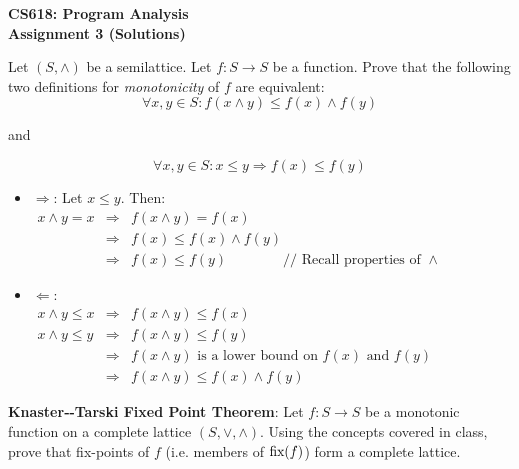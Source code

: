 \documentclass[12pt]{article}
\newcommand{\answer}[1]{{{\blue #1}}}
\newcommand{\ques}[1]{\bigskip\noindent{\bf Q#1.}}
\begin{document}

\begin{center}{\bf\Large
CS618: Program Analysis \\
Assignment 3 (Solutions)}
\end{center}

\ques{1} Let $(S, \wedge)$ be a semilattice. Let
  $f: S \rightarrow S$ be a function. Prove that the following
  two definitions for {\em monotonicity} of $f$ are equivalent:
  $$\forall x,y \in S: f(x \wedge y) \leq f(x) \wedge
  f(y)$$
  \begin{center} and \end{center}
  $$\forall x,y \in S: x\leq y \Rightarrow f(x) \leq f(y) $$

\answer{
  \begin{itemize}
  \item $\Rightarrow$: Let $x \leq y$. Then:\\
    $\begin{array}{rcl}
    x \wedge y = x &\Rightarrow& f(x \wedge y) = f(x) \\
    & \Rightarrow & f(x) \leq f(x) \wedge f(y) \\
    & \Rightarrow & f(x) \leq f(y) \qquad\qquad \mbox{// Recall properties of
      } \wedge
  \end{array}$
  \item $\Leftarrow$: \\
    $\begin{array}{rcl}
       x \wedge y \leq x &\Rightarrow& f(x \wedge y) \leq f(x) \\
       x \wedge y \leq y &\Rightarrow& f(x \wedge y) \leq f(y) \\
                         &\Rightarrow& f(x \wedge y) \mbox { is a lower bound on $f(x)$ and $f(y)$}\\
                         & \Rightarrow & f(x \wedge y) \leq f(x) \wedge f(y) 
  \end{array}$
  \end{itemize}
}

\bigskip
\ques{2} {\bf Knaster‐-Tarski Fixed Point Theorem}: Let
  $f : S\rightarrow S$ be a monotonic function on a complete
  lattice $(S,\vee,\wedge)$.  Using the concepts covered in
  class, prove that fix-points of $f$ (i.e. members of
  $\mbox{\rm fix}(f)$) form a complete lattice.
\end{document}
